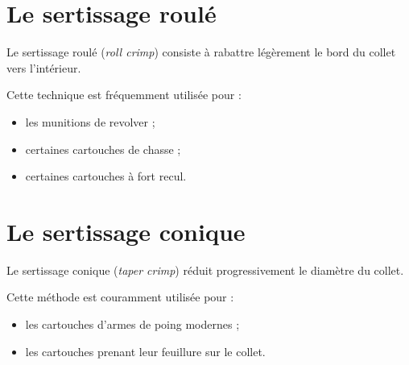 \section{Le sertissage roulé}

Le sertissage roulé (\emph{roll crimp}) consiste à rabattre légèrement le bord
du collet vers l'intérieur.

Cette technique est fréquemment utilisée pour :

\begin{itemize}
    \item les munitions de revolver ;
    \item certaines cartouches de chasse ;
    \item certaines cartouches à fort recul.
\end{itemize}

\section{Le sertissage conique}

Le sertissage conique (\emph{taper crimp}) réduit progressivement le diamètre
du collet.

Cette méthode est couramment utilisée pour :

\begin{itemize}
    \item les cartouches d'armes de poing modernes ;
    \item les cartouches prenant leur feuillure sur le collet.
\end{itemize}

